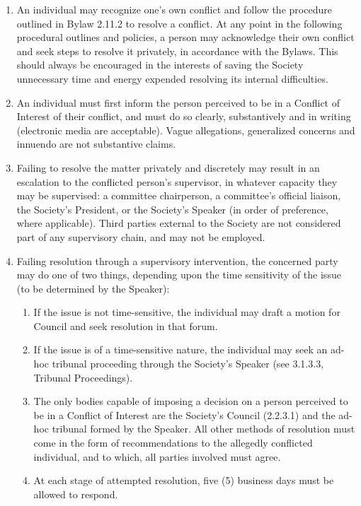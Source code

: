 \begin{enumerate} [align=left]
\item An individual may recognize one's own conflict and follow the procedure outlined in Bylaw 2.11.2 to resolve a conflict. At any point in the following procedural outlines and policies, a person may acknowledge their own conflict and seek steps to resolve it privately, in accordance with the Bylaws. This should always be encouraged in the interests of saving the Society unnecessary time and energy expended resolving its internal difficulties.
\item An individual must first inform the person perceived to be in a Conflict of Interest of their conflict, and must do so clearly, substantively and in writing (electronic media are acceptable). Vague allegations, generalized concerns and innuendo are not substantive claims.
\item Failing to resolve the matter privately and discretely may result in an escalation to the conflicted person’s supervisor, in whatever capacity they may be supervised: a committee chairperson, a committee's official liaison, the Society's President, or the Society's Speaker (in order of preference, where applicable). Third parties external to the Society are not considered part of any supervisory chain, and may not be employed.
\item Failing resolution through a supervisory intervention, the concerned party may do one of two things, depending upon the time sensitivity of the issue (to be determined by the Speaker):
\begin{enumerate} [label*=\arabic*., align=left]
\item If the issue is not time-sensitive, the individual may draft a motion for Council and seek resolution in that forum.
\item If the issue is of a time-sensitive nature, the individual may seek an ad-hoc tribunal proceeding through the Society’s Speaker (see 3.1.3.3, Tribunal Proceedings).
\item The only bodies capable of imposing a decision on a person perceived to be in a Conflict of Interest are the Society’s Council (2.2.3.1) and the ad-hoc tribunal formed by the Speaker. All other methods of resolution must come in the form of recommendations to the allegedly conflicted individual, and to which, all parties involved must agree.
\item  At each stage of attempted resolution, five (5) business days must be allowed to
respond.
\end{enumerate}
\end{enumerate}


